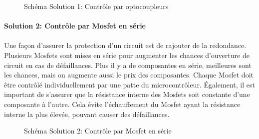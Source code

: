 		\begin{figure}[H]
			\centering
			\caption[]{Schéma Solution 1: Contrôle par optocoupleurs}
			\label{fig:contactorsol1}
		\end{figure}
		
		
		\paragraph*{Solution 2: Contrôle par Mosfet en série}
		\paragraph*{}
		Une façon d'assurer la protection d'un circuit est de rajouter de la redondance. Plusieurs Mosfets sont mises en série pour augmenter les chances d'ouverture de circuit en cas de défaillances. Plus il y a de composantes en série, meilleures sont les chances, mais on augmente aussi le prix des composantes. Chaque Mosfet doit être contrôlé individuellement par une patte du microcontrôleur. Également, il est important de s'assurer que la résistance interne des Mosfets soit constante d'une composante à l'autre. Cela évite l'échauffement du Mosfet ayant la résistance interne la plus élevée, pouvant causer des défaillances.
		
		\begin{figure}[H]
			\centering
			\caption{Schéma Solution 2: Contrôle par Mosfet en série}
			\label{fig:contactorsol2}
		\end{figure}
		

